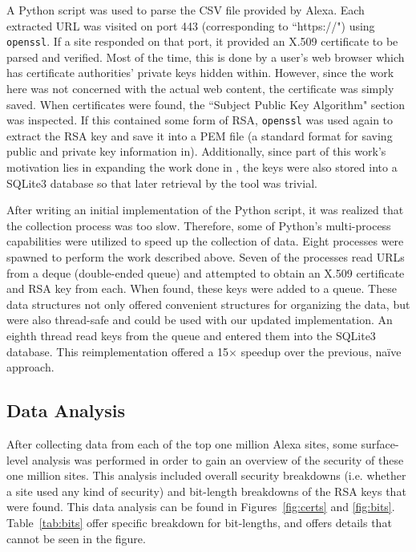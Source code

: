 \documentclass[smallextended]{svjour3}       %
\begin{document}
A Python script was used to parse the CSV file provided by Alexa. Each
extracted URL was visited on port 443 (corresponding to ``https://") using 
\texttt{openssl}. If a site responded on that port, it provided an X.509
certificate to be parsed and verified. Most of the time, this is done by a
user's web browser which has certificate authorities' private keys hidden
within. However, since the work here was not concerned with the actual web
content, the certificate was simply saved. When certificates were found, the
``Subject Public Key Algorithm" section was inspected. If this contained some
form of RSA, \texttt{openssl} was used again to extract the RSA key and save
it into a PEM file (a standard format for saving public and private key
information in). Additionally, since part of this work's motivation lies in
expanding the work done in \cite{scharfglass2012breaking}, the keys were also
stored into a SQLite3 database so that later retrieval by the tool was trivial.

After writing an initial implementation of the Python script, it was realized
that the collection process was too slow. Therefore, some of Python's
multi-process capabilities were utilized to speed up the collection of data.
Eight processes were spawned to perform the work described above. Seven of the
processes read URLs from a deque (double-ended queue) and attempted to obtain
an X.509 certificate and RSA key from each. When found, these keys were added
to a queue. These data structures not only offered convenient structures for
organizing the data, but were also thread-safe and could be used with our
updated implementation. An eighth thread read keys from the queue and entered
them into the SQLite3 database. This reimplementation offered a 15$\times$
speedup over the previous, na\"{i}ve approach.

\subsection{Data Analysis}
\label{subsec:datanalysis}
After collecting data from each of the top one million Alexa sites, some
surface-level analysis was performed in order to gain an overview of the
security of these one million sites. This analysis included overall security
breakdowns (i.e. whether a site used any kind of security) and
bit-length breakdowns of the RSA keys that were found. This data analysis can
be found in Figures~\ref{fig:certs} and \ref{fig:bits}. Table~\ref{tab:bits}
offer specific breakdown for bit-lengths, and offers details that cannot be
seen in the figure.
\end{document}

